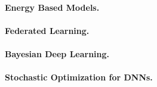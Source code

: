 \documentclass[twoside,11pt]{article}
\begin{document}
\lipsum[35]

\vspace{0.08in}
\paragraph{Energy Based Models.} \lipsum[35]

\vspace{0.08in}
\paragraph{Federated Learning.} \lipsum[35]

\vspace{0.08in}
\paragraph{Bayesian Deep Learning.} \lipsum[35]

\vspace{0.08in}
\paragraph{Stochastic Optimization for DNNs.} \lipsum[35]


\newpage



\textbf{}
\vspace{-0.3in}
\nocite{*}

\end{document}
